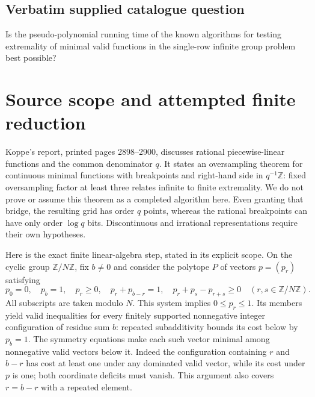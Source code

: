 \documentclass[11pt]{article}
\begin{document}
\subsection{Verbatim supplied catalogue question}
Is the pseudo-polynomial running time of the known algorithms for testing extremality of minimal valid functions in the single-row infinite group problem best possible?

\section{Source scope and attempted finite reduction}
Koppe's report, printed pages 2898--2900, discusses rational piecewise-linear
functions and the common denominator $q$. It states an oversampling theorem
for continuous minimal functions with breakpoints and right-hand side in
$q^{-1}\mathbb Z$: fixed oversampling factor at least three relates infinite
to finite extremality. We do not prove or assume this theorem as a completed
algorithm here. Even granting that bridge, the resulting grid has order $q$
points, whereas the rational breakpoints can have only order $\log q$ bits.
Discontinuous and irrational representations require their own hypotheses.

Here is the exact finite linear-algebra step, stated in its explicit scope.
On the cyclic group $\mathbb Z/N\mathbb Z$, fix $b\ne0$ and consider the
polytope $P$ of vectors $p=(p_r)$ satisfying
\[
p_0=0,\quad p_b=1,\quad p_r\ge0,\quad
p_r+p_{b-r}=1,\quad p_r+p_s-p_{r+s}\ge0\quad(r,s\in\mathbb Z/N\mathbb Z).
\]
All subscripts are taken modulo $N$. This system implies $0\le p_r\le1$.
Its members yield valid inequalities for every finitely supported nonnegative
integer configuration of residue sum $b$: repeated subadditivity bounds its
cost below by $p_b=1$. The symmetry equations make each such vector minimal
among nonnegative valid vectors below it. Indeed the configuration containing
$r$ and $b-r$ has cost at least one under any dominated valid vector, while
its cost under $p$ is one; both coordinate deficits must vanish. This argument
also covers $r=b-r$ with a repeated element.
\end{document}
